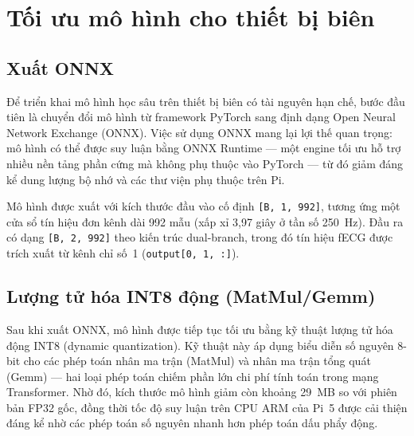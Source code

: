 \documentclass[../DoAn.tex]{subfiles}
\begin{document}
\section{Tối ưu mô hình cho thiết bị biên}

\subsection{Xuất ONNX}

Để triển khai mô hình học sâu trên thiết bị biên có tài nguyên hạn chế, bước đầu tiên là chuyển đổi mô hình từ framework PyTorch sang định dạng Open Neural Network Exchange (ONNX). Việc sử dụng ONNX mang lại lợi thế quan trọng: mô hình có thể được suy luận bằng ONNX Runtime --- một engine tối ưu hỗ trợ nhiều nền tảng phần cứng mà không phụ thuộc vào PyTorch --- từ đó giảm đáng kể dung lượng bộ nhớ và các thư viện phụ thuộc trên Pi.

Mô hình được xuất với kích thước đầu vào cố định \texttt{[B, 1, 992]}, tương ứng một cửa sổ tín hiệu đơn kênh dài 992 mẫu (xấp xỉ 3{,}97 giây ở tần số 250~Hz). Đầu ra có dạng \texttt{[B, 2, 992]} theo kiến trúc dual-branch, trong đó tín hiệu fECG được trích xuất từ kênh chỉ số~1 (\texttt{output[0, 1, :]}).

\subsection{Lượng tử hóa INT8 động (MatMul/Gemm)}

Sau khi xuất ONNX, mô hình được tiếp tục tối ưu bằng kỹ thuật lượng tử hóa động INT8 (dynamic quantization). Kỹ thuật này áp dụng biểu diễn số nguyên 8-bit cho các phép toán nhân ma trận (MatMul) và nhân ma trận tổng quát (Gemm) --- hai loại phép toán chiếm phần lớn chi phí tính toán trong mạng Transformer. Nhờ đó, kích thước mô hình giảm còn khoảng 29~MB so với phiên bản FP32 gốc, đồng thời tốc độ suy luận trên CPU ARM của Pi~5 được cải thiện đáng kể nhờ các phép toán số nguyên nhanh hơn phép toán dấu phẩy động.
\end{document}

